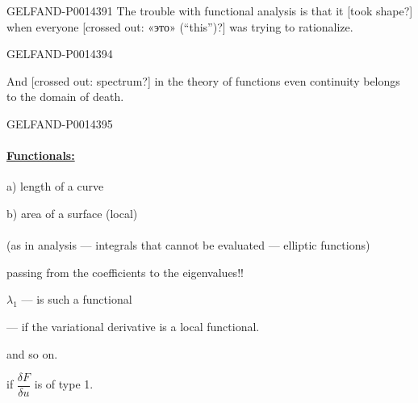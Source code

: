 \begin{GelfandAdjacentEvidence}{GELFAND-P001439}{1}
The trouble with functional analysis is that it [took shape?] when everyone [crossed out: «это» (“this”)?] was trying to rationalize.


\end{GelfandAdjacentEvidence}
\begin{GelfandAdjacentEvidence}{GELFAND-P001439}{4}


And [crossed out: spectrum?] in the theory of functions even continuity belongs to the domain of death.
\end{GelfandAdjacentEvidence}
\begin{GelfandAdjacentEvidence}{GELFAND-P001439}{5}


\paragraph*{\uline{Functionals:}}
a) length of a curve

b) area of a surface \qquad (local)

\paragraph*{}
(as in analysis — integrals that cannot be evaluated — elliptic functions)

passing from the coefficients to the eigenvalues!!

\(\lambda_1\) — is such a functional

 — if the variational derivative is a local functional.

and so on.

 if \(\dfrac{\delta F}{\delta u}\) is of type 1.
\end{GelfandAdjacentEvidence}
